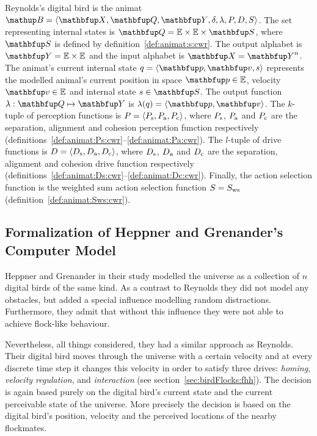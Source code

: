 \begin{definition}
\label{def:animat:cwr}
Reynolds's digital bird is the animat $\autom{B}=\langle\set{X},\set{Q},\set{Y},\delta,\lambda,P,D,S\rangle$. The set representing internal states is $\set{Q}=\E \times \E \times \set{S}$, where $\set{S}$ is defined by definition~\ref{def:animat:s:cwr}. The output alphabet is $\set{Y}=\E \times \E$ and the input alphabet is $\set{X}=\set{Y}^n$. The animat's current internal state $q=\langle\vect{p},\vect{v},s\rangle$ represents the modelled animal's current position in space $\vect{p} \in \E$, velocity $\vect{v} \in \E$ and internal state $s \in \set{S}$. The output function $\lambda: \set{Q} \mapsto \set{Y}$ is $\lambda(q)=\langle\vect{p},\vect{v}\rangle$. The $k$-tuple of perception functions is $P=\langle P_\textnormal{s},P_\textnormal{a},P_\textnormal{c}\rangle$, where $P_\textnormal{s}$, $P_\textnormal{a}$ and $P_\textnormal{c}$ are the separation, alignment and cohesion perception function respectively (definitions~\ref{def:animat:Ps:cwr}--\ref{def:animat:Pa:cwr}). The $l$-tuple of drive functions is $D=\langle D_\textnormal{s},D_\textnormal{a},D_\textnormal{c}\rangle$, where $D_\textnormal{s}$, $D_\textnormal{a}$ and $D_\textnormal{c}$ are the separation, alignment and cohesion drive function respectively (definitions~\ref{def:animat:Ds:cwr}--\ref{def:animat:Dc:cwr}). Finally, the action selection function is the weighted sum action selection function $S=S_\textnormal{ws}$ (definition~\ref{def:animat:Sws:cwr}).
\end{definition}

\subsection{Formalization of Heppner and Grenander's Computer Model}
\label{sec:animat:fhh}
Heppner and Grenander in their study \cite{heppner:1990} modelled the universe as a collection of $n$ digital birds of the same kind. As a contrast to Reynolds they did not model any obstacles, but added a special influence modelling random distractions. Furthermore, they admit that without this influence they were not able to achieve flock-like behaviour.

Nevertheless, all things considered, they had a similar approach as Reynolds. Their digital bird moves through the universe with a certain velocity and at every discrete time step it changes this velocity in order to satisfy three drives: \emph{homing}, \emph{velocity regulation}, and \emph{interaction} (see section~\ref{sec:birdFlocks:fhh}). The decision is again based purely on the digital bird's current state and the current perceivable state of the universe. More precisely the decision is based on the digital bird's position, velocity and the perceived locations of the nearby flockmates. 

